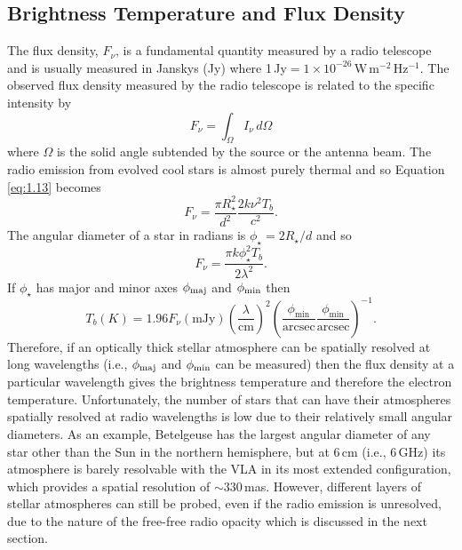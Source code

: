 \subsection{Brightness Temperature and Flux Density}\label{sec:1.8.2}
The flux density, $F_{\nu}$, is a fundamental quantity measured by a radio telescope and is usually measured in Janskys (Jy) where 1\,Jy$ = 1\times 10^{-26}$\,W\,m$^{-2}$\,Hz$^{-1}$. The observed flux density measured by the radio telescope is related to the specific intensity by
\begin{equation}\label{eq:1.13}
F_{\nu} = \int _{\Omega} I_{\nu}\,d\Omega
\end{equation}
where $\Omega$ is the solid angle subtended by the source or the antenna beam. The radio emission from evolved cool stars is almost purely thermal and so Equation \ref{eq:1.13} becomes 
\begin{equation}
F_{\nu} =  \frac{\pi R_{\star}^2}{d^2}\frac{2k\nu ^2T_{b}}{c^2}.
\end{equation}
The angular diameter of a star in radians is $\phi _{\star}=2R_{\star}/d$ and so
\begin{equation}
F_{\nu}=\frac{\pi k\phi _{\star}^2 T_b}{2\lambda ^2}.
\end{equation}
If $\phi _{\star}$ has major and minor axes $\phi _{\rm{maj}}$ and $\phi _{\rm{min}}$ then
\begin{equation}\label{eq:1.43aa}
T_{b} (K)=1.96F_{\nu}(\mathrm{mJy})\left(\frac{\lambda}{\mathrm{cm}}\right)^2\left(\frac{\phi _{\mathrm{min}}}{\mathrm{arcsec}} \frac{\phi _{\mathrm{min}}}{\mathrm{arcsec}}\right)^{-1}.
\end{equation}
Therefore, if an optically thick stellar atmosphere can be spatially resolved at long wavelengths (i.e., $\phi _{\rm{maj}}$ and $\phi _{\rm{min}}$ can be measured) then the flux density at a particular wavelength gives the brightness temperature and therefore the electron temperature. Unfortunately, the number of stars that can have their atmospheres spatially resolved at radio wavelengths is low due to their relatively small angular diameters. As an example, Betelgeuse has the largest angular diameter of any star other than the Sun in the northern hemisphere, but at 6\,cm (i.e., 6\,GHz) its atmosphere is barely resolvable with the VLA in its most extended configuration, which provides a spatial resolution of $\sim 330$\,mas. However, different layers of stellar atmospheres can still be probed, even if the radio emission is unresolved, due to the nature of the free-free radio opacity which is discussed in the next section.

